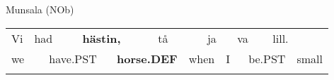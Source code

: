 
\begin{listWWNumileveli}
\item {}

\begin{styleExample}
Munsala (NOb)

\end{styleExample}

\end{listWWNumileveli}

\begin{listWWNumxlviileveli}
\item {}

\end{listWWNumxlviileveli}

\begin{tabular}{llllllllllllll}
\lsptoprule
Vi & \multicolumn{2}{l}{had

} & \multicolumn{2}{l}{{\bfseries hästin,}

} & \multicolumn{2}{l}{tå

} & \multicolumn{2}{l}{ja

} & \multicolumn{2}{l}{va

} & \multicolumn{2}{l}{lill.

} & \\
\multicolumn{2}{l}{we

} & \multicolumn{2}{l}{have.PST

} & \multicolumn{2}{l}{{\bfseries horse.DEF}

} & \multicolumn{2}{l}{when

} & \multicolumn{2}{l}{I 

} & \multicolumn{2}{l}{be.PST

} & \multicolumn{2}{l}{small

}\\
\lspbottomrule
\end{tabular}

